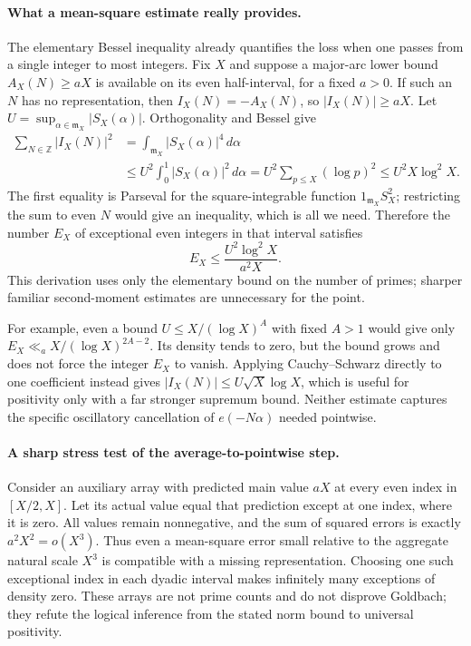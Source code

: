\documentclass[11pt]{article}
\begin{document}
\paragraph{What a mean-square estimate really provides.}
The elementary Bessel inequality already quantifies the loss when one
passes from a single integer to most integers. Fix $X$ and suppose a
major-arc lower bound $A_X(N)\ge aX$ is available on its even half-interval,
for a fixed $a>0$. If such an $N$ has no representation, then
$I_X(N)=-A_X(N)$, so $|I_X(N)|\ge aX$.
Let $U=\sup_{\alpha\in\mathfrak m_X}|S_X(\alpha)|$.
Orthogonality and Bessel give
\begin{align*}
 \sum_{N\in\mathbb Z}|I_X(N)|^2
 &=\int_{\mathfrak m_X}|S_X(\alpha)|^4\,d\alpha\\
 &\le U^2\int_0^1|S_X(\alpha)|^2\,d\alpha
   =U^2\sum_{p\le X}(\log p)^2
   \le U^2 X\log^2 X.
\end{align*}
The first equality is Parseval for the square-integrable function
$1_{\mathfrak m_X}S_X^2$; restricting the sum to even $N$ would give
an inequality, which is all we need. Therefore the number $E_X$ of
exceptional even integers in that interval satisfies
\begin{equation}\label{ra:25:exceptional}
 E_X\le\frac{U^2\log^2X}{a^2X}.
\end{equation}
This derivation uses only the elementary bound on the number of primes;
sharper familiar second-moment estimates are unnecessary for the point.

For example, even a bound $U\le X/(\log X)^A$ with fixed $A>1$ would
give only $E_X\ll_a X/(\log X)^{2A-2}$. Its density tends to zero,
but the bound grows and does not force the integer $E_X$ to vanish.
Applying Cauchy--Schwarz directly to one coefficient instead gives
$|I_X(N)|\le U\sqrt X\log X$, which is useful for positivity only
with a far stronger supremum bound. Neither estimate captures the
specific oscillatory cancellation of $e(-N\alpha)$ needed pointwise.

\paragraph{A sharp stress test of the average-to-pointwise step.}
Consider an auxiliary array with predicted main value $aX$ at every
even index in $[X/2,X]$. Let its actual value equal that prediction
except at one index, where it is zero. All values remain nonnegative,
and the sum of squared errors is exactly $a^2X^2=o(X^3)$.
Thus even a mean-square error small relative to the aggregate natural
scale $X^3$ is compatible with a missing representation. Choosing one
such exceptional index in each dyadic interval makes infinitely many
exceptions of density zero. These arrays are not prime counts and do
not disprove Goldbach; they refute the logical inference from the stated
norm bound to universal positivity.
\end{document}
